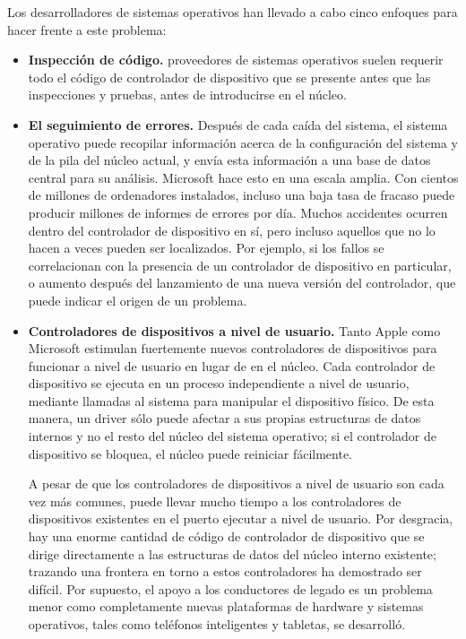 \documentclass[10pt]{book}
\begin{document}
Los desarrolladores de sistemas operativos han llevado a cabo cinco enfoques para hacer frente a este problema:

\begin{itemize}
\item \textbf{Inspección de código.} proveedores de sistemas operativos suelen requerir todo el código de controlador de dispositivo que se presente antes que las inspecciones y pruebas, antes de introducirse en el núcleo.

\item \textbf{El seguimiento de errores.} Después de cada caída del sistema, el sistema operativo puede recopilar información acerca de la configuración del sistema y de la pila del núcleo actual, y envía esta información a una base de datos central para su análisis. Microsoft hace esto en una escala amplia. Con cientos de millones de ordenadores instalados, incluso una baja tasa de fracaso puede producir millones de informes de errores por día. Muchos accidentes ocurren dentro del controlador de dispositivo en sí, pero incluso aquellos que no lo hacen a veces pueden ser localizados. Por ejemplo, si los fallos se correlacionan con la presencia de un controlador de dispositivo en particular, o aumento después del lanzamiento de una nueva versión del controlador, que puede indicar el origen de un problema.

\item \textbf{Controladores de dispositivos a nivel de usuario.} Tanto Apple como Microsoft estimulan fuertemente nuevos controladores de dispositivos para funcionar a nivel de usuario en lugar de en el núcleo. Cada controlador de dispositivo se ejecuta en un proceso independiente a nivel de usuario, mediante llamadas al sistema para manipular el dispositivo físico. De esta manera, un driver sólo puede afectar a sus propias estructuras de datos internos y no el resto del núcleo del sistema operativo; si el controlador de dispositivo se bloquea, el núcleo puede reiniciar fácilmente.

A pesar de que los controladores de dispositivos a nivel de usuario son cada vez más comunes, puede llevar mucho tiempo a los controladores de dispositivos existentes en el puerto ejecutar a nivel de usuario. Por desgracia, hay una enorme cantidad de código de controlador de dispositivo que se dirige directamente a las estructuras de datos del núcleo interno existente; trazando una frontera en torno a estos controladores ha demostrado ser difícil. Por supuesto, el apoyo a los conductores de legado es un problema menor como completamente nuevas plataformas de hardware y sistemas operativos, tales como teléfonos inteligentes y tabletas, se desarrolló.


\end{itemize}
\end{document}
